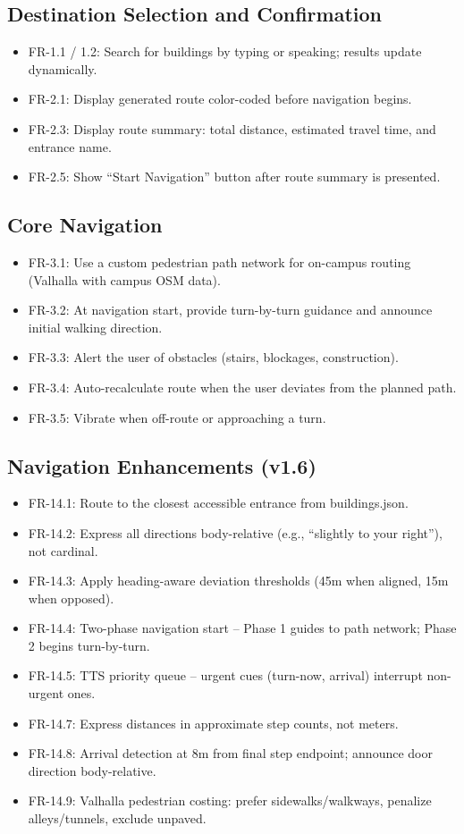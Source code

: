 \documentclass[12pt]{article}
\begin{document}
\subsection{Destination Selection and Confirmation}
\begin{itemize}
    \item FR-1.1 / 1.2: Search for buildings by typing or speaking; results update dynamically.
    \item FR-2.1: Display generated route color-coded before navigation begins.
    \item FR-2.3: Display route summary: total distance, estimated travel time, and entrance name.
    \item FR-2.5: Show ``Start Navigation'' button after route summary is presented.
\end{itemize}

\subsection{Core Navigation}
\begin{itemize}
    \item FR-3.1: Use a custom pedestrian path network for on-campus routing (Valhalla with campus OSM data).
    \item FR-3.2: At navigation start, provide turn-by-turn guidance and announce initial walking direction.
    \item FR-3.3: Alert the user of obstacles (stairs, blockages, construction).
    \item FR-3.4: Auto-recalculate route when the user deviates from the planned path.
    \item FR-3.5: Vibrate when off-route or approaching a turn.
\end{itemize}

\subsection{Navigation Enhancements (v1.6)}
\begin{itemize}
    \item FR-14.1: Route to the closest accessible entrance from buildings.json.
    \item FR-14.2: Express all directions body-relative (e.g., ``slightly to your right''), not cardinal.
    \item FR-14.3: Apply heading-aware deviation thresholds (45m when aligned, 15m when opposed).
    \item FR-14.4: Two-phase navigation start -- Phase 1 guides to path network; Phase 2 begins turn-by-turn.
    \item FR-14.5: TTS priority queue -- urgent cues (turn-now, arrival) interrupt non-urgent ones.
    \item FR-14.7: Express distances in approximate step counts, not meters.
    \item FR-14.8: Arrival detection at 8m from final step endpoint; announce door direction body-relative.
    \item FR-14.9: Valhalla pedestrian costing: prefer sidewalks/walkways, penalize alleys/tunnels, exclude unpaved.
\end{itemize}
\end{document}

